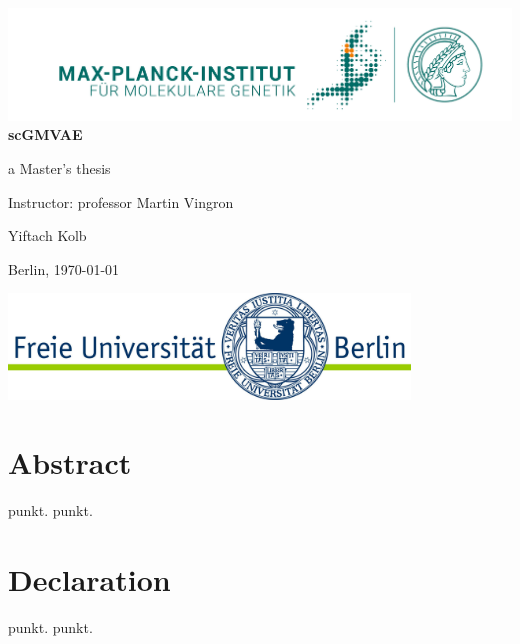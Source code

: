 \documentclass[11pt, a4paper]{report}
\theoremstyle{plain}
\theoremstyle{definition}
\theoremstyle{remark}
\begin{document}
\begin{titlepage}
\begin{center}
{\includegraphics[width=1.0\textwidth]{images/MPIMG_RGB_gruen.png}}\\
\vspace*{1cm}
\Large
\textbf{scGMVAE}



\large
a Master's thesis
\vspace{1.0cm}

Instructor: professor Martin Vingron

\vfill

Yiftach Kolb

Berlin, \today

\vfill
{\includegraphics[width=0.8\textwidth]{images/fu-logo_bildschirm_RGB1.jpg}}
\end{center}
\end{titlepage}


\chapter*{Abstract}
punkt.
punkt.

\chapter*{Declaration}
punkt.
punkt.
\end{document}
